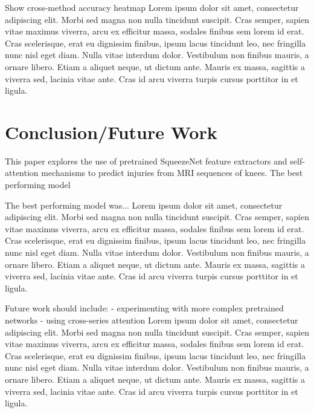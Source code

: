 \documentclass[10pt,twocolumn,letterpaper]{article}
\begin{document}
Show cross-method accuracy heatmap
Lorem ipsum dolor sit amet, consectetur adipiscing elit. Morbi sed magna non nulla tincidunt suscipit. Cras semper, sapien vitae maximus viverra, arcu ex efficitur massa, sodales finibus sem lorem id erat. Cras scelerisque, erat eu dignissim finibus, ipsum lacus tincidunt leo, nec fringilla nunc nisl eget diam. Nulla vitae interdum dolor. Vestibulum non finibus mauris, a ornare libero. Etiam a aliquet neque, ut dictum ante. Mauris ex massa, sagittis a viverra sed, lacinia vitae ante. Cras id arcu viverra turpis cursus porttitor in et ligula.

\section{Conclusion/Future Work} %

This paper explores the use of pretrained SqueezeNet feature extractors and self-attention mechanisms to predict injuries from MRI sequences of knees. The best performing model

The best performing model was...
Lorem ipsum dolor sit amet, consectetur adipiscing elit. Morbi sed magna non nulla tincidunt suscipit. Cras semper, sapien vitae maximus viverra, arcu ex efficitur massa, sodales finibus sem lorem id erat. Cras scelerisque, erat eu dignissim finibus, ipsum lacus tincidunt leo, nec fringilla nunc nisl eget diam. Nulla vitae interdum dolor. Vestibulum non finibus mauris, a ornare libero. Etiam a aliquet neque, ut dictum ante. Mauris ex massa, sagittis a viverra sed, lacinia vitae ante. Cras id arcu viverra turpis cursus porttitor in et ligula.

Future work should include:
- experimenting with more complex pretrained networks
- using cross-series attention
Lorem ipsum dolor sit amet, consectetur adipiscing elit. Morbi sed magna non nulla tincidunt suscipit. Cras semper, sapien vitae maximus viverra, arcu ex efficitur massa, sodales finibus sem lorem id erat. Cras scelerisque, erat eu dignissim finibus, ipsum lacus tincidunt leo, nec fringilla nunc nisl eget diam. Nulla vitae interdum dolor. Vestibulum non finibus mauris, a ornare libero. Etiam a aliquet neque, ut dictum ante. Mauris ex massa, sagittis a viverra sed, lacinia vitae ante. Cras id arcu viverra turpis cursus porttitor in et ligula.
\end{document}
